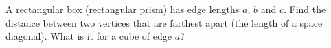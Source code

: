 A rectangular box (rectangular prism) has edge lengths $a$, $b$ and $c$. Find the distance between two vertices that are farthest apart (the length of a space diagonal). What is it for a cube of edge $a$?
